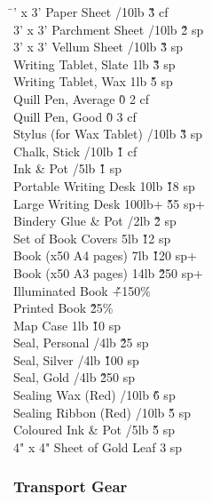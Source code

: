 \begin{multicols}{3}
{\begin{tabbing}
\hspace{0.8\linewidth}\= ' x 3' Paper Sheet			/10lb			\' \` 3 cf \\
3' x 3' Parchment Sheet			/10lb			\' \` 2 sp \\
3' x 3' Vellum Sheet			/10lb			\' \` 3 sp \\
Writing Tablet, Slate			\> 1lb			\' \` 3 sp \\
Writing Tablet, Wax			\> 1lb			\' \` 5 sp \\
Quill Pen, Average			\` 0 2 cf \\
Quill Pen, Good			\` 0 3 cf \\
Stylus (for Wax Tablet)			/10lb			\' \` 3 sp \\
Chalk, Stick			/10lb			\' \` 1 cf \\
Ink \& Pot			/5lb			\' \` 1 sp \\
Portable Writing Desk			\> 10lb			\' \` 18 sp \\
Large Writing Desk			\> 100lb+			\' \` 55 sp+ \\
Bindery Glue \& Pot			/2lb			\' \` 2 sp \\
Set of Book Covers			\> 5lb			\' \` 12 sp \\
Book (x50 A4 pages)			\> 7lb			\' \` 120 sp+ \\
Book (x50 A3 pages)			\> 14lb			\' \` 250 sp+ \\
Illuminated Book						\' \` +150\% \\
Printed Book						\' \` 25\% \\
Map Case			\> 1lb			\' \` 10 sp \\
Seal, Personal			/4lb			\' \` 25 sp \\
Seal, Silver			/4lb			\' \` 100 sp \\
Seal, Gold			/4lb			\' \` 250 sp \\
Sealing Wax (Red)			/10lb			\' \` 6 sp \\
Sealing Ribbon (Red)			/10lb			\' \` 5 sp \\
Coloured Ink \& Pot			/5lb			\' \` 5 sp \\
4" x 4" Sheet of Gold Leaf			 3 sp			\' \` \\
\end{tabbing}

\subsubsection{Transport Gear}

}
\end{multicols}

